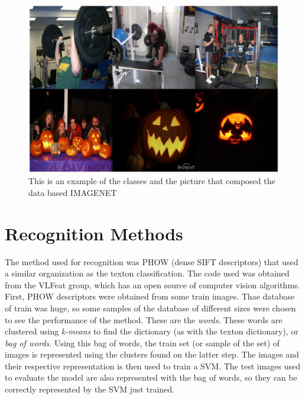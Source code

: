 \documentclass[10pt,twocolumn,letterpaper]{article}
\begin{document}
\begin{figure}[h]
\begin{center}
\includegraphics[width=1\linewidth]{images/DataBase.eps}
\end{center}
   \caption{
This is an example of the classes and the picture that composed the data based IMAGENET
   }
\label{DataBase}
\end{figure}
\section{Recognition Methods}

The method used for recognition was PHOW (dense SIFT descriptors) that used a similar organization as the texton classification. The code used was obtained from the VLFeat group, which has an open source of computer vision algorithms. First, PHOW descriptors were obtained from some train images. Thae database of train was huge, so some samples of the database of different sizes were chosen to see the performance of the method. These are the \textit{words}. These words are clustered using \textit{k-means} to find the dictionary (as with the texton dictionary), or \textit{bag of words}. Using this bag of words, the train set (or sample of the set) of images is represented using the clusters found on the latter step. The images and their respective representation is then used to train a SVM. The test images used to evaluate the model are also represented with the bag of words, so they can be correctly represented by the SVM just trained. 


\end{document}
